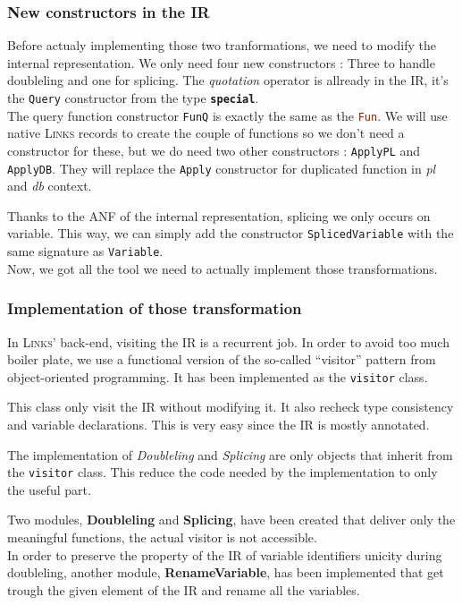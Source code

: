 \documentclass[11pt]{article}
\newcommand\mysc[1]{{\rmfamily\textsc{#1}}\xspace}
\newcommand\links{\mysc{Links}}
\newcommand\sig[1]{{\tt\bf #1}}
\newcommand\effect[1]{{\em #1}}
\newcommand\ocamlc[1]{\lstinline[language=ML]{#1}}
\newcommand\module[1]{{\bf #1}}
\begin{document}
\subsubsection{New constructors in the IR}

Before actualy implementing those two tranformations, we need to modify the internal representation. We only need four new constructors : Three to handle doubleling and one for splicing. The \emph{quotation} operator is allready in the IR, it's the \ocamlc{Query} constructor from the type \sig{special}.\\

The query function constructor \ocamlc{FunQ} is exactly the same as the \ocamlc{Fun}. We will use native \links records to create the couple of functions so we don't need a constructor for these, but we do need two other constructors : \ocamlc{ApplyPL} and \ocamlc{ApplyDB}. They will replace the \ocamlc{Apply} constructor for duplicated function in \effect{pl} and \effect{db} context.

Thanks to the ANF of the internal representation, splicing we only occurs on variable. This way, we can simply add the constructor \ocamlc{SplicedVariable} with the same signature as \ocamlc{Variable}.\\

Now, we got all the tool we need to actually implement those transformations.

\subsubsection{Implementation of those transformation}

In \links' back-end, visiting the IR is a recurrent job. In order to avoid too much boiler plate, we use a functional version of the so-called ``visitor'' pattern from object-oriented programming. It has been implemented as the \ocamlc{visitor} class.

This class only visit the IR without modifying it. It also recheck type consistency and variable declarations. This is very easy since the IR is mostly annotated.

The implementation of \emph{Doubleling} and \emph{Splicing} are only objects that inherit from the \ocamlc{visitor} class. This reduce the code needed by the implementation to only the useful part.

Two modules, \module{Doubleling} and \module{Splicing}, have been created that deliver only the meaningful functions, the actual visitor is not accessible.\\
In order to preserve the property of the IR of variable identifiers unicity during doubleling, another module, \module{RenameVariable}, has been implemented that get trough the given element of the IR and rename all the variables.
\end{document}
